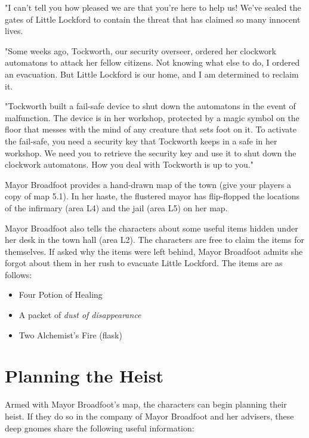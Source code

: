 \documentclass[10pt,a4paper,twoside,bg=print,twocolumn,openany,nodeprecatedcode]{dndbook}
\begin{document}
\begin{DndReadAloud}{}
"I can't tell you how pleased we are that you're here to help us! We've sealed the gates of Little Lockford to contain the threat that has claimed so many innocent lives.

"Some weeks ago, Tockworth, our security overseer, ordered her clockwork automatons to attack her fellow citizens. Not knowing what else to do, I ordered an evacuation. But Little Lockford is our home, and I am determined to reclaim it.

"Tockworth built a fail-safe device to shut down the automatons in the event of malfunction. The device is in her workshop, protected by a magic symbol on the floor that messes with the mind of any creature that sets foot on it. To activate the fail-safe, you need a security key that Tockworth keeps in a safe in her workshop. We need you to retrieve the security key and use it to shut down the clockwork automatons. How you deal with Tockworth is up to you."

\end{DndReadAloud}

Mayor Broadfoot provides a hand-drawn map of the town (give your players a copy of map 5.1). In her haste, the flustered mayor has flip-flopped the locations of the infirmary (area L4) and the jail (area L5) on her map.

Mayor Broadfoot also tells the characters about some useful items hidden under her desk in the town hall (area L2). The characters are free to claim the items for themselves. If asked why the items were left behind, Mayor Broadfoot admits she forgot about them in her rush to evacuate Little Lockford. The items are as follows:


\begin{itemize}
\item Four Potion of Healing
\item A packet of \textit{dust of disappearance}
\item Two Alchemist's Fire (flask)
\end{itemize}

\section{Planning the Heist}
Armed with Mayor Broadfoot's map, the characters can begin planning their heist. If they do so in the company of Mayor Broadfoot and her advisers, these deep gnomes share the following useful information:
\end{document}
